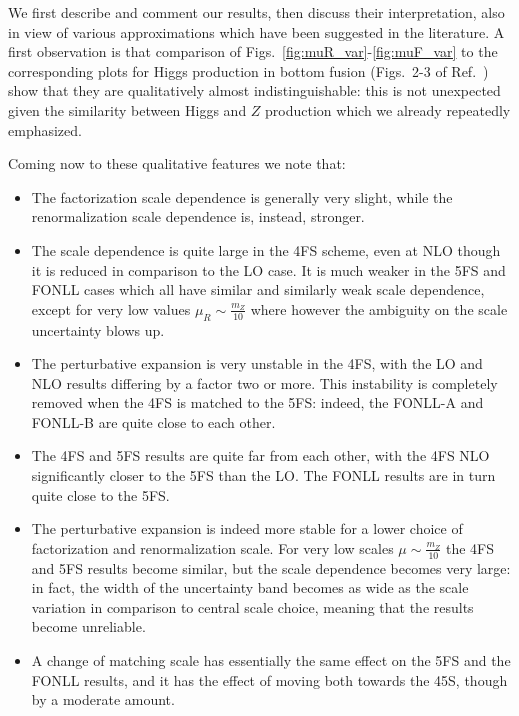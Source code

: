 \documentclass[12pt]{article}
\begin{document}




We first describe and comment our
results, then discuss their interpretation, also in view of various
approximations which have been suggested in the literature. A first observation is that  comparison of
Figs.~\ref{fig:muR_var}-\ref{fig:muF_var} to the corresponding
plots for Higgs production in bottom fusion (Figs.~2-3 of
Ref.~\cite{Forte:2016sja}) show that they are qualitatively almost
indistinguishable: this is not unexpected given the similarity between
Higgs and $Z$ production which we already repeatedly emphasized. 

Coming now to these qualitative features we note that:
\begin{itemize}
\item The factorization scale dependence is generally very slight,
  while the renormalization scale dependence is, instead, stronger.
\item The scale dependence is quite large in the 4FS scheme, even at
  NLO though it is reduced in comparison to the LO case. It is much
  weaker in the 5FS and FONLL cases which all have similar and
  similarly weak scale dependence, except for very low values
  $\mu_R\sim \frac{m_Z}{10}$ where however the ambiguity on the scale
  uncertainty blows up. 
\item The perturbative expansion is  very
  unstable in the 4FS, with the LO and NLO results differing by a
  factor two or more. This instability is completely removed when the
  4FS is matched to the 5FS: indeed, the FONLL-A and FONLL-B are quite
  close to each other.
\item The 4FS and 5FS results are quite far from each other, with
  the 4FS NLO significantly
  closer to the 5FS than the LO. The FONLL results are in turn quite close to the 5FS.
\item The perturbative expansion is indeed more stable for a lower
  choice of factorization and renormalization scale. For very low
  scales $\mu\sim\frac{m_Z}{10}$ the 4FS and 5FS results become
  similar, but the scale dependence becomes very large: in fact, the
  width of the uncertainty band becomes as wide as the scale variation
  in comparison to central scale choice, meaning that the results
  become unreliable.
\item A change of matching scale has essentially the same effect on
  the 5FS and the FONLL results, and it has the effect of moving both
  towards the 45S, though by a moderate amount.
\end{itemize}
\end{document}
